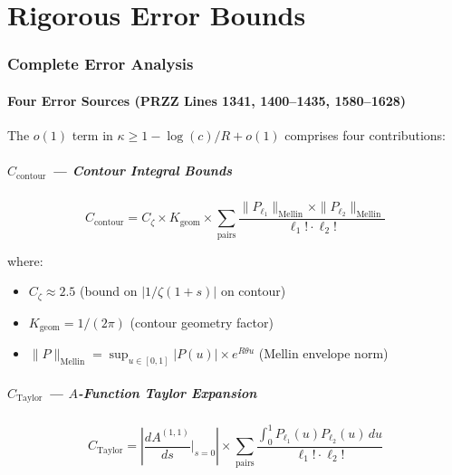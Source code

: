 \documentclass[11pt]{article}
\begin{document}

\part{Rigorous Error Bounds}

\section{Complete Error Analysis}
\label{sec:error}

\subsection{Four Error Sources (PRZZ Lines 1341, 1400--1435, 1580--1628)}

The $o(1)$ term in $\kappa \geq 1 - \log(c)/R + o(1)$ comprises four contributions:

\subsubsection{$C_{\text{contour}}$ --- Contour Integral Bounds}

\begin{equation}
C_{\text{contour}} = C_\zeta \times K_{\text{geom}} \times \sum_{\text{pairs}} \frac{\|P_{\ell_1}\|_{\text{Mellin}} \times \|P_{\ell_2}\|_{\text{Mellin}}}{\ell_1! \cdot \ell_2!}
\end{equation}

where:
\begin{itemize}
\item $C_\zeta \approx 2.5$ (bound on $|1/\zeta(1+s)|$ on contour)
\item $K_{\text{geom}} = 1/(2\pi)$ (contour geometry factor)
\item $\|P\|_{\text{Mellin}} = \sup_{u \in [0,1]} |P(u)| \times e^{R\theta u}$ (Mellin envelope norm)
\end{itemize}

\subsubsection{$C_{\text{Taylor}}$ --- $A$-Function Taylor Expansion}

\begin{equation}
C_{\text{Taylor}} = \left|\frac{dA^{(1,1)}}{ds}\Big|_{s=0}\right| \times \sum_{\text{pairs}} \frac{\int_0^1 P_{\ell_1}(u) P_{\ell_2}(u) \, du}{\ell_1! \cdot \ell_2!}
\end{equation}
\end{document}
